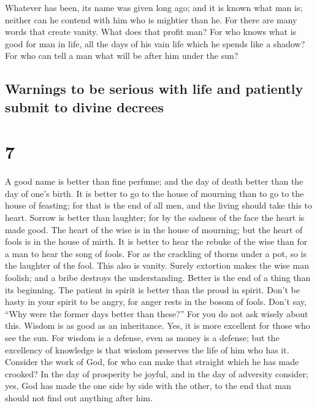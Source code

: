  Whatever has been, its name was given long ago; and it
is known what man is; neither can he contend with him who is mightier
than he.  For there are many words that create vanity.
What does that profit man?  For who knows what is good
for man in life, all the days of his vain life which he spends like a
shadow? For who can tell a man what will be after him under the sun?

\hypertarget{warnings-to-be-serious-with-life-and-patiently-submit-to-divine-decrees}{%
\subsection{Warnings to be serious with life and patiently submit to
divine
decrees}\label{warnings-to-be-serious-with-life-and-patiently-submit-to-divine-decrees}}

\hypertarget{section-6}{%
\section{7}\label{section-6}}

 A good name is better than fine perfume; and the day of
death better than the day of one's birth.  It is better to
go to the house of mourning than to go to the house of feasting; for
that is the end of all men, and the living should take this to heart.
 Sorrow is better than laughter; for by the sadness of the
face the heart is made good.  The heart of the wise is in
the house of mourning; but the heart of fools is in the house of mirth.
 It is better to hear the rebuke of the wise than for a
man to hear the song of fools.  For as the crackling of
thorns under a pot, so is the laughter of the fool. This also is vanity.
 Surely extortion makes the wise man foolish; and a bribe
destroys the understanding.  Better is the end of a thing
than its beginning. The patient in spirit is better than the proud in
spirit.  Don't be hasty in your spirit to be angry, for
anger rests in the bosom of fools.  Don't say, ``Why were
the former days better than these?'' For you do not ask wisely about
this.  Wisdom is as good as an inheritance. Yes, it is
more excellent for those who see the sun.  For wisdom is
a defense, even as money is a defense; but the excellency of knowledge
is that wisdom preserves the life of him who has it. 
Consider the work of God, for who can make that straight which he has
made crooked?  In the day of prosperity be joyful, and in
the day of adversity consider; yes, God has made the one side by side
with the other, to the end that man should not find out anything after
him.

